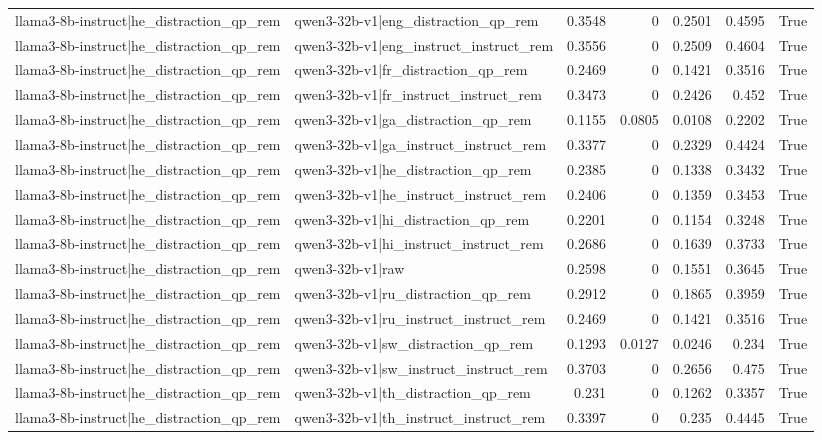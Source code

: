 \begin{table}
\begin{tabular}{l l r r r r l}
llama3-8b-instruct|he_distraction_qp_rem & qwen3-32b-v1|eng_distraction_qp_rem & 0.3548 & 0 & 0.2501 & 0.4595 & True \\
llama3-8b-instruct|he_distraction_qp_rem & qwen3-32b-v1|eng_instruct_instruct_rem & 0.3556 & 0 & 0.2509 & 0.4604 & True \\
llama3-8b-instruct|he_distraction_qp_rem & qwen3-32b-v1|fr_distraction_qp_rem & 0.2469 & 0 & 0.1421 & 0.3516 & True \\
llama3-8b-instruct|he_distraction_qp_rem & qwen3-32b-v1|fr_instruct_instruct_rem & 0.3473 & 0 & 0.2426 & 0.452 & True \\
llama3-8b-instruct|he_distraction_qp_rem & qwen3-32b-v1|ga_distraction_qp_rem & 0.1155 & 0.0805 & 0.0108 & 0.2202 & True \\
llama3-8b-instruct|he_distraction_qp_rem & qwen3-32b-v1|ga_instruct_instruct_rem & 0.3377 & 0 & 0.2329 & 0.4424 & True \\
llama3-8b-instruct|he_distraction_qp_rem & qwen3-32b-v1|he_distraction_qp_rem & 0.2385 & 0 & 0.1338 & 0.3432 & True \\
llama3-8b-instruct|he_distraction_qp_rem & qwen3-32b-v1|he_instruct_instruct_rem & 0.2406 & 0 & 0.1359 & 0.3453 & True \\
llama3-8b-instruct|he_distraction_qp_rem & qwen3-32b-v1|hi_distraction_qp_rem & 0.2201 & 0 & 0.1154 & 0.3248 & True \\
llama3-8b-instruct|he_distraction_qp_rem & qwen3-32b-v1|hi_instruct_instruct_rem & 0.2686 & 0 & 0.1639 & 0.3733 & True \\
llama3-8b-instruct|he_distraction_qp_rem & qwen3-32b-v1|raw & 0.2598 & 0 & 0.1551 & 0.3645 & True \\
llama3-8b-instruct|he_distraction_qp_rem & qwen3-32b-v1|ru_distraction_qp_rem & 0.2912 & 0 & 0.1865 & 0.3959 & True \\
llama3-8b-instruct|he_distraction_qp_rem & qwen3-32b-v1|ru_instruct_instruct_rem & 0.2469 & 0 & 0.1421 & 0.3516 & True \\
llama3-8b-instruct|he_distraction_qp_rem & qwen3-32b-v1|sw_distraction_qp_rem & 0.1293 & 0.0127 & 0.0246 & 0.234 & True \\
llama3-8b-instruct|he_distraction_qp_rem & qwen3-32b-v1|sw_instruct_instruct_rem & 0.3703 & 0 & 0.2656 & 0.475 & True \\
llama3-8b-instruct|he_distraction_qp_rem & qwen3-32b-v1|th_distraction_qp_rem & 0.231 & 0 & 0.1262 & 0.3357 & True \\
llama3-8b-instruct|he_distraction_qp_rem & qwen3-32b-v1|th_instruct_instruct_rem & 0.3397 & 0 & 0.235 & 0.4445 & True \\

\end{tabular}
\end{table}
